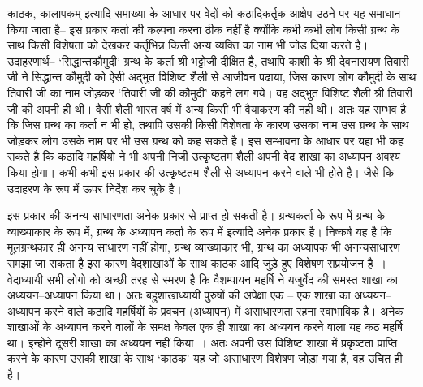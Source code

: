 काठक, कालापकम् इत्यादि समाख्या के आधार पर वेदों को कठादिकर्तृक आक्षेप उठने पर यह समाधान किया जाता है– इस प्रकार कर्ता की कल्पना करना ठीक नहीं है क्योंकि कभी कभी लोग किसी ग्रन्थ के साथ किसी विशेषता को देखकर कर्तृभिन्न किसी अन्य व्यक्ति का नाम भी जोड दिया करते है। उदाहरणार्थ– ‘सिद्धान्तकौमुदी' ग्रन्थ के कर्ता श्री भट्टोजी दीक्षित है, तथापि काशी के श्री देवनारायण तिवारी जी ने सिद्धान्त कौमुदी को ऐसी अद्भुत विशिष्ट शैली से आजीवन पढाया, जिस कारण लोग कौमुदी के साथ तिवारी जी का नाम जोड़कर ‘तिवारी जी की कौमुदी' कहने लग गये। वह अद्भुत विशिष्ट शैली श्री तिवारी जी की अपनी ही थी। वैसी शैली भारत वर्ष में अन्य किसी भी वैयाकरण की नही थी। अतः यह सम्भव है कि जिस ग्रन्थ का कर्ता न भी हो, तथापि उसकी किसी विशेषता के कारण उसका नाम उस ग्रन्थ के साथ जोड़कर लोग उसके नाम पर भी उस ग्रन्थ को कह सकते है। इस सम्भावना के आधार पर यहा भी कह सकते है कि कठादि महर्षियो ने भी अपनी निजी उत्कृृष्टतम शैली अपनी वेद शाखा का अध्यापन अवश्य किया होगा। कभी कभी इस प्रकार की उत्कृृष्टतम शैली से अध्यापन करने वाले भी होते है। जैसे कि उदाहरण के रूप में ऊपर निर्देश कर चुके है। 

इस प्रकार की अनन्य साधारणता अनेक प्रकार से प्राप्त हो सकती है। ग्रन्थकर्ता के रूप में ग्रन्थ के व्याख्याकार के रूप में, ग्रन्थ के अध्यापन कर्ता के रूप में इत्यादि अनेक प्रकार है। निष्कर्ष यह है कि मूलग्रन्थकार ही अनन्य साधारण नहीं होगा, ग्रन्थ व्याख्याकार भी, ग्रन्थ का अध्यापक भी अनन्यसाधारण समझा जा सकता है इस कारण वेदशाखाओं के साथ काठक आदि जुड़े हुए विशेषण सप्रयोजन है~। वेदाध्यायी सभी लोगो को अच्छी तरह से स्मरण है कि वैशम्पायन महर्षि ने यजुर्वेद की समस्त शाखा का अध्ययन–अध्यापन किया था। अतः बहुशाखाध्यायी पुरुषों की अपेक्षा एक – एक शाखा का अध्ययन–अध्यापन करने वाले कठादि महर्षियों के प्रवचन (अध्यापन) में असाधारणता रहना स्वाभाविक है। अनेक शाखाओं के अध्यापन करने वालों के समक्ष केवल एक ही शाखा का अध्ययन करने वाला यह कठ महर्षि था। इन्होने दूसरी शाखा का अध्ययन नहीं किया~। अतः अपनी उस विशिष्ट शाखा में प्रकृष्टता प्राप्ति करने के कारण उसकी शाखा के साथ ‘काठक' यह जो असाधारण विशेषण जोड़ा गया है, वह उचित ही है। 

